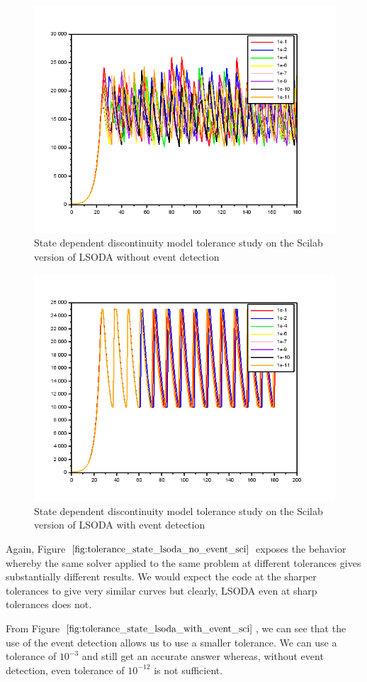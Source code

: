 \begin{figure}[h]
\centering
\includegraphics[width=0.7\linewidth]{./figures/tolerance_state_lsoda_no_event_sci}
\caption{State dependent discontinuity model tolerance study on the Scilab version of LSODA without event detection}
\label{fig:tolerance_state_lsoda_no_event_sci}
\end{figure}

\begin{figure}[h]
\centering
\includegraphics[width=0.7\linewidth]{./figures/tolerance_state_lsoda_with_event_sci}
\caption{State dependent discontinuity model tolerance study on the Scilab version of LSODA with event detection}
\label{fig:tolerance_state_lsoda_with_event_sci}
\end{figure}

Again, Figure $\ref{fig:tolerance_state_lsoda_no_event_sci}$ exposes the behavior whereby the same solver applied to the same problem at different tolerances gives substantially different results. We would expect the code at the sharper tolerances to give very similar curves but clearly, LSODA even at sharp tolerances does not.

From Figure $\ref{fig:tolerance_state_lsoda_with_event_sci}$, we can see that the use of the event detection allows us to use a smaller tolerance. We can use a tolerance of $10^{-3}$ and still get an accurate answer whereas, without event detection, even tolerance of $10^{-12}$ is not sufficient.

